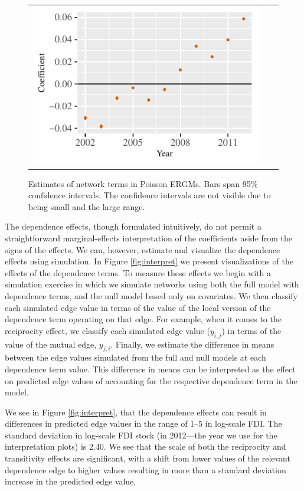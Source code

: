 \documentclass[reqno,onecolumn,letterpaper,12pt]{article}
\begin{document}
\begin{figure}[]
\begin{tabular}{@{\hskip -.05cm}c@{\hskip -.2cm}c@{\hskip -.2cm}c}
\includegraphics[height=.165\textheight, clip=true, trim=.5cm .5cm 0cm .1cm]{figures/main_rl_plots/Mutuality_notOECD.pdf} \\
\end{tabular}
\caption{\label{fig:net_effects} Estimates of network terms in Poisson ERGMs. Bars span 95\% confidence intervals. The confidence intervals are not visible due to being small and the large range.}
\end{figure}
The dependence effects, though formulated intuitively, do not permit a straightforward marginal-effects interpretation of the coefficients aside from the signs of the effects. We can, however, estimate and visualize the dependence effects using simulation. In Figure \ref{fig:interpret} we present visualizations of the effects of the dependence terms. To measure these effects we begin with a simulation exercise in which we simulate networks using both the full model with dependence terms, and the null model based only on covariates. We then classify each simulated edge value in terms of the value of the local version of the dependence term operating on that edge. For example, when it comes to the reciprocity effect, we classify each simulated edge value ($y_{i,j}$) in terms of the value of the mutual edge, $y_{j,i}$. Finally, we estimate the difference in means between the edge values simulated from the full and null models at each dependence term value. This difference in means can be interpreted as the effect on predicted edge values of accounting for the respective dependence term in the model.


We see in Figure \ref{fig:interpret}, that the dependence effects can result in differences in predicted edge values in the range of 1--5 in log-scale FDI. The standard deviation in log-scale FDI stock (in 2012---the year we use for the interpretation plots) is 2.40.  We see that the scale of both the reciprocity and transitivity effects are significant, with a shift from lower values of the relevant dependence edge to higher values resulting in more than a standard deviation increase in the predicted edge value.
\end{document}
